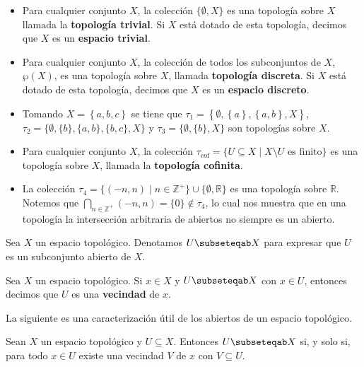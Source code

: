 \begin{Ejm}\label{Ejm:Topologias}
   \phantom{o}\par
   \begin{itemize}
      \item Para cualquier conjunto $X$, la colección $\{\emptyset, X\}$ es una topología sobre $X$ llamada la \textbf{topología trivial}. Si $X$ está dotado de esta topología, decimos que $X$ es un \textbf{espacio trivial}.
      \item Para cualquier conjunto $X$, la colección de todos los subconjuntos de $X$, $\wp(X)$, es una topología sobre $X$, llamada \textbf{topología discreta}. Si $X$ está dotado de esta topología, decimos que $X$ es un \textbf{espacio discreto}.
      \item Tomando $X=\left\lbrace a,b,c\right\rbrace$ se tiene que $\tau_1=\left\lbrace \emptyset, \left\lbrace a\right\rbrace, \left\lbrace a,b\right\rbrace, X\right\rbrace$, $\tau_2=\{\emptyset,\{b\},\{a,b\},\allowbreak\{b,c\},X\}$ y $\tau_3=\{\emptyset,\{b\},X\}$ son topologías sobre $X$.
      \item Para cualquier conjunto $X$, la colección $\tau_{\text{cof}}=\{U\subseteq X\mid X\setminus U \text{ es finito}\}$ es una topología sobre $X$, llamada la \textbf{topología cofinita}.
      \item La colección $\tau_4=\{(-n,n)\mid n\in \mathbb{Z}^+\}\cup\{\emptyset, \mathbb{R}\}$ es una topología sobre $\mathbb{R}$. Notemos que $\bigcap_{n\in \mathbb{Z}^+}(-n,n)=\{0\}\notin \tau_4$, lo cual nos muestra que en una topología la intersección arbitraria de abiertos no siempre es un abierto.
   \end{itemize}
\end{Ejm}
\begin{Not}
    Sea $X$ un espacio topológico. Denotamos $U\subseteqab X$ para expresar que $U$ es un subconjunto abierto de $X$.
\end{Not}
\begin{Def}
   Sea $X$ un espacio topológico. Si $x\in X$ y $U\subseteqab X$ con $x\in U$, entonces decimos que $U$ es una \textbf{vecindad} de $x$. 
\end{Def}
La siguiente es una caracterización útil de los abiertos de un espacio topológico.
\begin{Prop}\label{Prop:Caracterizacion_abiertos}
   Sean $X$ un espacio topológico y $U\subseteq X$. Entonces $U\subseteqab X$ si, y solo si, para todo $x\in U$ existe una vecindad $V$ de $x$ con $V\subseteq U$.
\end{Prop}
